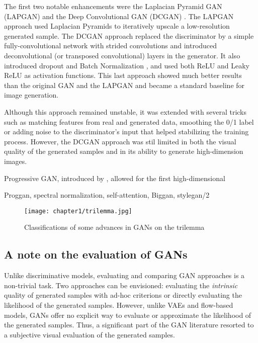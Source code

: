 The first two notable enhancements were the Laplacian Pyramid GAN (LAPGAN) \citep{Denton2015} and the Deep Convolutional GAN (\ac{DCGAN}) \citep{Radford2015}. The LAPGAN approach used Laplacian Pyramids \citep{Burt1983} to iteratively upscale a low-resolution generated sample. The \ac{DCGAN} approach replaced the discriminator by a simple fully-convolutional network \citep{Springenberg2015} with strided convolutions and introduced deconvolutional (or transposed convolutional) layers in the generator. It also introduced dropout \citep{Srivastava2014} and Batch Normalization \citep{Ioffe2015}, and used both \ac{ReLU} \citep{Nair2010} and Leaky \ac{ReLU} \citep{Maas2013} as activation functions. This last approach showed much better results than the original GAN and the LAPGAN and became a standard baseline for image generation.

Although this approach remained unstable, it was extended \citep{Salimans2016} with several tricks such as matching features from real and generated data, smoothing the 0/1 label or adding noise to the discriminator's input \citep{Sonderby2017} that helped stabilizing the training process. However, the DCGAN approach was stil limited in both the visual quality of the generated samples and in its ability to generate high-dimension images.

Progressive GAN, introduced by \citet{Karras2017}, allowed for the first high-dimensional 


Proggan, spectral normalization, self-attention, Biggan,  stylegan/2


\begin{figure}
		\centering
	\texttt{[image: chapter1/trilemma.jpg]}
	\label{fig:trilemma}
	\caption{Classifications of some advances in GANs on the trilemma}
\end{figure}



\subsection{A note on the  evaluation of  GANs}

Unlike discriminative models, evaluating and comparing \ac{GAN} approaches is a non-trivial task. Two approaches can be envisioned: evaluating the \textit{intrinsic} quality of generated samples with ad-hoc criterions or directly evaluating the likelihood of the generated samples. However, unlike \ac{VAE}s and flow-based models, \ac{GAN}s offer no explicit way to evaluate or approximate the likelihood of the generated samples. Thus, a significant part of the \ac{GAN} literature resorted to a subjective visual evaluation of the generated samples. 

